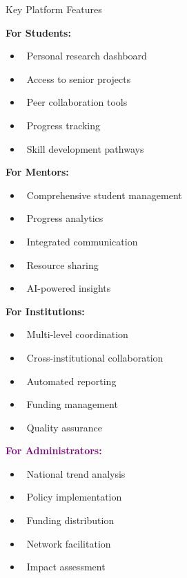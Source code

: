 \documentclass[aspectratio=169]{beamer}
\begin{document}
\begin{frame}{Key Platform Features}
\begin{multicols}{2}
\textbf{\textcolor{narmpblue}{For Students:}}
\begin{itemize}
\item \faUser\ Personal research dashboard
\item \faArchive\ Access to senior projects
\item \faUsers\ Peer collaboration tools
\item \faChartLine\ Progress tracking
\item \faGraduationCap\ Skill development pathways
\end{itemize}

\textbf{\textcolor{narmporange}{For Mentors:}}
\begin{itemize}
\item \faTachometerAlt\ Comprehensive student management
\item \faChartBar\ Progress analytics
\item \faComments\ Integrated communication
\item \faShare\ Resource sharing
\item \faRobot\ AI-powered insights
\end{itemize}

\textbf{\textcolor{narmpgreen}{For Institutions:}}
\begin{itemize}
\item \faBuilding\ Multi-level coordination
\item \faHandshake\ Cross-institutional collaboration
\item \faFileAlt\ Automated reporting
\item \faDollarSign\ Funding management
\item \faAward\ Quality assurance
\end{itemize}

\textbf{\textcolor{purple}{For Administrators:}}
\begin{itemize}
\item \faGlobe\ National trend analysis
\item \faGavel\ Policy implementation
\item \faMoneyBill\ Funding distribution
\item \faNetworkWired\ Network facilitation
\item \faChartPie\ Impact assessment
\end{itemize}
\end{multicols}
\end{frame}
\end{document}
